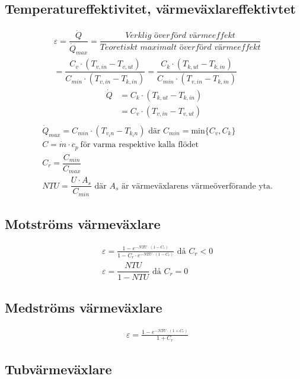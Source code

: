 	\subsection*{Temperatureffektivitet, värmeväxlareffektivtet}
	\begin{align*}
		&\varepsilon = \dfrac{\dot{Q}}{\dot{Q}_{max}}=
		\dfrac{\textit{Verklig överförd värmeeffekt}}{\textit{Teoretiskt maximalt överförd värmeeffekt}} \\
		& = \dfrac{C_v \cdot (T_{v,in} - T_{v,ut})}{C_{min} \cdot (T_{v,in} - T_{k,in})}
		= \dfrac{C_k \cdot (T_{k,ut} - T_{k,in})}{C_{min} \cdot (T_{v,in} - T_{k,in})}
	\end{align*}
	\begin{align*}
		\dot{Q}&=C_k \cdot (T_{k,ut} - T_{k,in}) \\
		 &=C_v \cdot (T_{v,in} - T_{v,ut}) \\
	\end{align*}
	\vspace{-4em} %
	\begin{align*}
	&\dot{Q}_{max}=C_{min} \cdot (T_{v_in} - T_{k_in}) \text{ där } C_{min} = \text{min} \{C_v, C_k\} \\
	& C = \dot{m} \cdot c_p \ \text{för varma respektive kalla flödet} \\
	& C_r = \dfrac{C_{min}}{C_{max}} \\
	&\textit{NTU}=\dfrac{U \cdot A_s}{C_{min}} \text{ där } A_s \text{ är värmeväxlarens värmeöverförande yta.}
	\end{align*}
	\subsection*{Motströms värmeväxlare}
	\begin{align*}
		& \varepsilon = \frac{1 - e^{-NTU \cdot (1 - C_r)}}{1 - C_r \cdot e^{-NTU \cdot (1 - C_r)}} \text{ då } C_r<0\\
		& \varepsilon = \dfrac{NTU}{1-NTU} \text{ då } C_r=0
	\end{align*}
	\subsection*{Medströms värmeväxlare}
	\begin{align*}
		& \varepsilon = \frac{1 - e^{-NTU \cdot (1 + C_r)}}{1 + C_r} 
	\end{align*}
	\subsection*{Tubvärmeväxlare}
